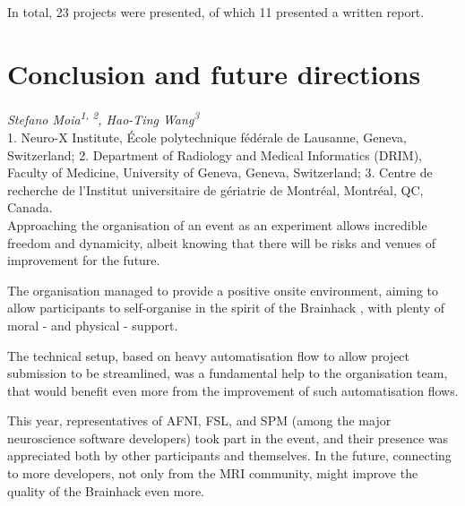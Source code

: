 \documentclass[10pt,a4paper,twocolumns]{proc}
\newcommand{\authors}[1]{\emph{\footnotesize #1} \\}
\newcommand{\affiliations}[1]{{\scriptsize #1} \\}
\begin{document}
In total, 23 projects were presented, of which 11 presented a written
report.













\section{Conclusion and future directions}
\authors{Stefano Moia\textsuperscript{1, 2}, %
Hao-Ting Wang\textsuperscript{3}}
%
\affiliations{1. Neuro-X Institute, École polytechnique fédérale de Lausanne, Geneva, Switzerland; %
2. Department of Radiology and Medical Informatics (DRIM), Faculty of Medicine, University of Geneva, Geneva, Switzerland; %
3. Centre de recherche de l'Institut universitaire de gériatrie de Montréal, Montréal, QC, Canada.}


Approaching the organisation of an event as an experiment allows
incredible freedom and dynamicity, albeit knowing that there will be
risks and venues of improvement for the future.

The organisation managed to provide a positive onsite environment,
aiming to allow participants to self-organise in the spirit of the
Brainhack \parencite{Gau2021}, with plenty of moral - and physical - support.

The technical setup, based on heavy automatisation flow to allow project
submission to be streamlined, was a fundamental help to the organisation
team, that would benefit even more from the improvement of such
automatisation flows.

This year, representatives of AFNI, FSL, and SPM (among the major
neuroscience software developers) took part in the event, and their
presence was appreciated both by other participants and themselves. In
the future, connecting to more developers, not only from the MRI
community, might improve the quality of the Brainhack even more.
\end{document}
